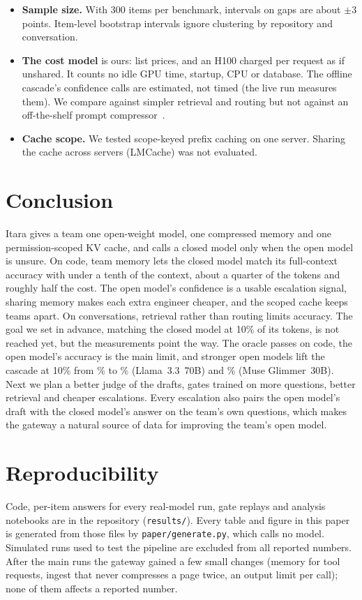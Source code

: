 \documentclass[10pt,twocolumn]{article}
\begin{document}
\begin{itemize}
\item \textbf{Sample size.} With 300 items per benchmark, intervals on gaps are about $\pm$3 points. Item-level bootstrap intervals ignore clustering by repository and conversation.
\item \textbf{The cost model} is ours: list prices, and an H100 charged per request as if unshared. It counts no idle GPU time, startup, CPU or database. The offline cascade's confidence calls are estimated, not timed (the live run measures them). We compare against simpler retrieval and routing but not against an off-the-shelf prompt compressor~\citep{jiang2023llmlingua}.
\item \textbf{Cache scope.} We tested scope-keyed prefix caching on one server. Sharing the cache across servers (LMCache) was not evaluated.
\end{itemize}

\section{Conclusion}
Itara gives a team one open-weight model, one compressed memory and one permission-scoped KV cache, and calls a closed model only when the open model is unsure. On code, team memory lets the closed model match its full-context accuracy with under a tenth of the context, about a quarter of the tokens and roughly half the cost. The open model's confidence is a usable escalation signal, sharing memory makes each extra engineer cheaper, and the scoped cache keeps teams apart. On conversations, retrieval rather than routing limits accuracy. The goal we set in advance, matching the closed model at 10\% of its tokens, is not reached yet, but the measurements point the way. The oracle passes on code, the open model's accuracy is the main limit, and stronger open models lift the cascade at 10\% from \cascadeSwe\% to \bigCascadeTen\% (Llama~3.3~70B) and \glimCascadeTen\% (Muse Glimmer~30B). Next we plan a better judge of the drafts, gates trained on more questions, better retrieval and cheaper escalations. Every escalation also pairs the open model's draft with the closed model's answer on the team's own questions, which makes the gateway a natural source of data for improving the team's open model.

\section*{Reproducibility}
Code, per-item answers for every real-model run, gate replays and analysis notebooks are in the repository (\texttt{results/}). Every table and figure in this paper is generated from those files by \texttt{paper/generate.py}, which calls no model. Simulated runs used to test the pipeline are excluded from all reported numbers. After the main runs the gateway gained a few small changes (memory for tool requests, ingest that never compresses a page twice, an output limit per call); none of them affects a reported number.
\end{document}
